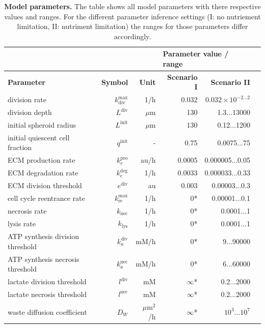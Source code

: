 \documentclass[10pt,letterpaper]{article}
\newcommand{\sI}[1]{{\color{red}#1}}
\newcommand{\sII}[1]{{\color{blue}#1}}
\begin{document}
\begin{table}[!ht]
\begin{adjustwidth}{-0.5in}{0in} %
\caption{
{\bf Model parameters.} The table shows all model parameters with there respective values and ranges. For the different parameter inference settings (I: no nutriement limitation, II: nutriment limitation) the ranges for those parameters differ accordingly. }
\begin{tabular}{|p{6cm}|r|r|r|r|r|}
\hline
\multicolumn{3}{|l|}{\bf } & \multicolumn{2}{|l|}{\bf Parameter value / range}\\ \hline
{\bf Parameter} 					&{\bf Symbol} &{\bf Unit} &\sI{\bf Scenario I} &\sII{\bf Scenario II}\\ \hline
division rate 					&$k_{\text{div}}^{\max}$ & 1/h & 0.032 & $0.032 \times 10^{-2...2}$\\ \hline
division depth 					&$L^{\text{div}}$ & $\mu$m & 130 & 1.3...13000\\ \hline
initial spheroid radius 			&$L^{\text{init}}$ & $\mu$m & 130 & 0.12...1200\\ \hline
initial quiescent cell fraction 		& $q^{\text{init}}$ &-& 0.75& 0.0075...75\\ \hline
ECM production rate 			&$k_{e}^{\text{pro}}$  & au/h&0.0005 &0.000005...0.05\\ \hline
ECM degradation rate 			&$k_{e}^{\text{deg}}$ &1/h&0.0033 &0.000033...0.33\\ \hline
ECM division threshold 			&$e^{\text{div}}$ &au &0.003 &0.00003...0.3\\ \hline
\hline
cell cycle reentrance rate 			&$k^{\max}_{\text{re}}$ &1/h &0*&0.00001...0.1\\ \hline
necrosis rate 					&$k_{\text{nec}}$ &1/h&0*&0.0001...1\\ \hline
lysis rate 						&$k_{\text{lys}}$ &1/h&0*&0.0001...1\\ \hline
ATP synthesis division threshold 			&$k_a^{\text{div}}$ &mM/h& 0*& 9...90000\\ \hline
ATP synthesis necrosis threshold 			&$k_a^{\text{nec}}$ &mM/h& 0*& 6...60000\\ \hline
lactate division threshold 			&$l^{\text{div}}$  &mM&$\infty$* & 0.2...2000\\ \hline
lactate necrosis threshold 			&$l^{\text{nec}}$ &mM &$\infty$* & 0.2...2000\\ \hline
waste diffusion coefficient 			&$D_W$& $\mu$m$^{2}$/h&$\infty$*& $10^{3}...10^{7}$\\ \hline

\end{tabular}
\end{adjustwidth}
\end{table}
\end{document}
